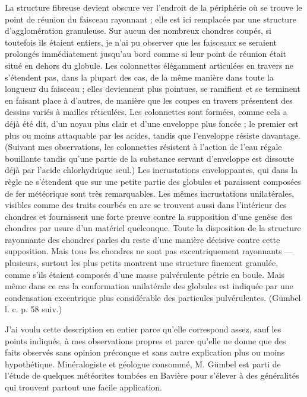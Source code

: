 \documentclass[a4paper, 12pt, oneside, french]{book}
\begin{document}
La structure fibreuse devient obscure ver l'endroit de la périphérie où se trouve le point de réunion du faisceau rayonnant ; elle est ici remplacée par une structure d'agglomération granuleuse. Sur aucun des nombreux chondres coupés, si toutefois ils étaient entiers, je n'ai pu observer que les faisceaux se seraient prolongés immédiatement jusqu'au bord comme si leur point de réunion était situé en dehors du globule. Les colonnettes élégamment articulées en travers ne s'étendent pas, dans la plupart des cas, de la même manière dans toute la longueur du faisceau ; elles deviennent plus pointues, se ramifient et se terminent en faisant place à d'autres, de manière que les coupes en travers présentent des dessins variés à mailles réticulées. Les colonnettes sont formées, comme cela a déjà été dit, d'un noyau plus clair et d'une enveloppe plus foncée ; le premier est plus ou moins attaquable par les acides, tandis que l'enveloppe résiste davantage. \fg (Suivant mes observations, les colonnettes résistent à l'action de l'eau régale bouillante tandis qu'une partie de la substance servant d'enveloppe est dissoute déjà par l'acide chlorhydrique seul.) \og Les incrustations enveloppantes, qui dans la règle ne s'étendent que sur une petite partie des globules et paraissent composées de fer météorique sont très remarquables. Les mêmes incrustations unilatérales, visibles comme des traits courbés en arc se trouvent aussi dans l'intérieur des chondres et fournissent une forte preuve contre la supposition d'une genèse des chondres par usure d'un matériel quelconque. Toute la disposition de la structure rayonnante des chondres parles du reste d'une manière décisive contre cette supposition. Mais tous les chondres ne sont pas excentriquement rayonnants --- plusieurs, surtout les plus petits montrent une structure finement granulée, comme s'ils étaient composés d'une masse pulvérulente pétrie en boule. Mais même dans ce cas la conformation unilatérale des globules est indiquée par une condensation excentrique plus considérable des particules pulvérulentes. \fg (Gümbel l. c. p. 58 suiv.)

J'ai voulu cette description en entier parce qu'elle correspond assez, sauf les points indiqués, à mes observations propres et parce qu'elle ne donne que des faits observés sans opinion préconçue et sans autre explication plus ou moins hypothétique. Minéralogiste et géologue consommé, M. Gümbel est parti de l'étude de quelques météorites tombées en Bavière pour s'élever à des généralités qui trouvent partout une facile application.
\end{document}

